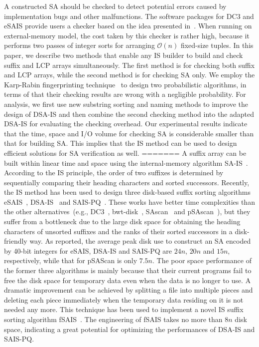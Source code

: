 \documentclass[10pt,journal,compsoc]{IEEEtran}
\begin{document}
A constructed SA should be checked to detect potential errors caused by implementation bugs and other malfunctions. The software packages for DC3 and eSAIS provide users a checker based on the idea presented in~\cite{Dementiev2008a}. When running on external-memory model, the cost taken by this checker is rather high, because it performs two passes of integer sorts for arranging $\mathcal{O}(n)$ fixed-size tuples. In this paper, we describe two methods that enable any IS builder to build and check suffix and LCP arrays simultaneously. The first method is for checking both suffix and LCP arrays, while the second method is for checking SA only. We employ the Karp-Rabin fingerprinting technique~\cite{Karp1987} to design two probabilistic algorithms, in terms of that their checking results are wrong with a negligible probability. For analysis, we first use new substring sorting and naming methods to improve the design of DSA-IS and then combine the second checking method into the adapted DSA-IS for evaluating the checking overhead. Our experimental results indicate that the time, space and I/O volume for checking SA is considerable smaller than that for building SA. This implies that the IS method can be used to design efficient solutions for SA verification as well.
=======
A suffix array can be built within linear time and space using the internal-memory algorithm SA-IS~\cite{Nong11}. According to the IS principle, the order of two suffixes is determined by sequentially comparing their heading characters and sorted successors. Recently, the IS method has been used to design three disk-based suffix sorting algorithms eSAIS~\cite{Bingmann12}, DSA-IS~\cite{Nong15} and SAIS-PQ~\cite{Liu15}. These works have better time complexities than the other alternatives~(e.g., DC3~\cite{Dementiev2008a}, bwt-disk~\cite{Ferragina2012}, SAscan~\cite{Karkkainen2014} and pSAscan~\cite{Karkkainen2015}), but they suffer from a bottleneck due to the large disk space for obtaining the heading characters of unsorted suffixes and the ranks of their sorted successors in a disk-friendly way. As reported, the average peak disk use to construct an SA encoded by 40-bit integers for eSAIS, DSA-IS and SAIS-PQ are $24n$, $20n$ and $15n$, respectively, while that for pSAScan is only $7.5n$. The poor space performance of the former three algorithms is mainly because that their current programs fail to free the disk space for temporary data even when the data is no longer to use. A dramatic improvement can be achieved by splitting a file into multiple pieces and deleting each piece immediately when the temporary data residing on it is not needed any more. This technique has been used to implement a novel IS suffix sorting algorithm fSAIS~\cite{Karkkainen2017}. The engineering of fSAIS takes no more than $8n$ disk space, indicating a great potential for optimizing the performances of DSA-IS and SAIS-PQ.
\end{document}
